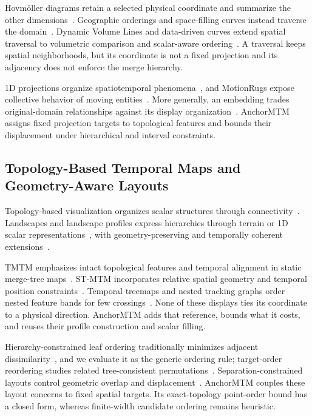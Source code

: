 \documentclass[review]{vgtc}
\begin{document}
Hovm\"oller diagrams retain a selected physical coordinate and summarize the other dimensions~\cite{Hovmoller:1949}. Geographic orderings and space-filling curves instead traverse the domain~\cite{Guo:2006:SpatialOrder,Dafner:2000:CSFC}. Dynamic Volume Lines and data-driven curves extend spatial traversal to volumetric comparison and scalar-aware ordering~\cite{Weissenboeck:2019:DVL,Zhou:2021:DSF}. A traversal keeps spatial neighborhoods, but its coordinate is not a fixed projection and its adjacency does not enforce the merge hierarchy.

1D projections organize spatiotemporal phenomena~\cite{Franke:2021:1DP}, and MotionRugs expose collective behavior of moving entities~\cite{Buchmueller:2019:MR}. More generally, an embedding trades original-domain relationships against its display organization~\cite{Nonato:2019:MP}. AnchorMTM assigns fixed projection targets to topological features and bounds their displacement under hierarchical and interval constraints.

\subsection{Topology-Based Temporal Maps and Geometry-Aware Layouts}
Topology-based visualization organizes scalar structures through connectivity~\cite{Heine:2016:Survey}. Landscapes and landscape profiles express hierarchies through terrain or 1D scalar representations~\cite{Weber:2007:TL,Oesterling:2013:TLP}, with geometry-preserving and temporally coherent extensions~\cite{Beketayev:2012:GPTL,Herick:2020:TCTL}.

TMTM emphasizes intact topological features and temporal alignment in static merge-tree maps~\cite{Koepp:2023:TMTM}. ST-MTM incorporates relative spatial geometry and temporal position constraints~\cite{STMTM:2026}. Temporal treemaps and nested tracking graphs order nested feature bands for few crossings~\cite{Koepp:2019:TT,Lukasczyk:2017:NTG}. None of these displays ties its coordinate to a physical direction. AnchorMTM adds that reference, bounds what it costs, and reuses their profile construction and scalar filling.

Hierarchy-constrained leaf ordering traditionally minimizes adjacent dissimilarity~\cite{BarJoseph:2001:OLO}, and we evaluate it as the generic ordering rule; target-order reordering studies related tree-consistent permutations~\cite{Bulteau:2022:RT}. Separation-constrained layouts control geometric overlap and displacement~\cite{Dwyer:2006:IPSEP,Li:2019:SOI}. AnchorMTM couples these layout concerns to fixed spatial targets. Its exact-topology point-order bound has a closed form, whereas finite-width candidate ordering remains heuristic.
\end{document}
